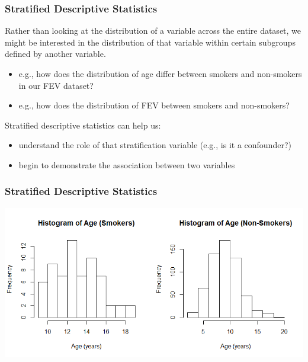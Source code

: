 \documentclass[12pt, 
hyperref={colorlinks=true, linkcolor=blue, urlcolor=cyan}]{beamer}
\begin{document}
\begin{frame}
\frametitle{Stratified Descriptive Statistics} %

Rather than looking at the distribution of a variable across the entire dataset, we might be interested in the distribution of that variable within certain subgroups defined by another variable. \vspace{-0.3cm}
\begin{itemize}
\item e.g., how does the distribution of age differ between smokers and non-smokers in our FEV dataset?
\item e.g., how does the distribution of FEV between smokers and non-smokers?
\end{itemize}

Stratified descriptive statistics can help us:\vspace{-0.3cm}
\begin{itemize}
\item understand the role of that  stratification variable (e.g., is it a confounder?)
\item begin to demonstrate the association between two variables
\end{itemize}

\end{frame}

\begin{frame}
\frametitle{Stratified Descriptive Statistics}

\begin{center} \includegraphics[width=\textwidth]{./histogram-age-stratified} \end{center}

\end{frame}
\end{document}
